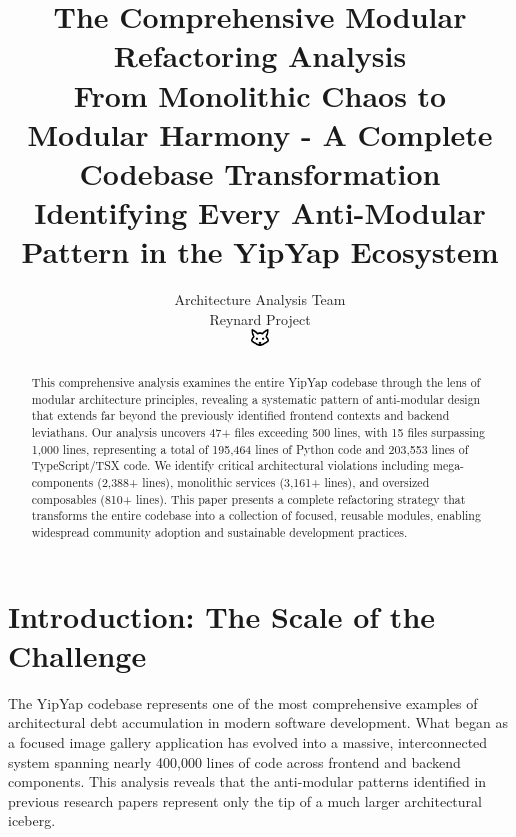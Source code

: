 \documentclass[11pt]{article}
\begin{document}
\title{\textbf{The Comprehensive Modular Refactoring Analysis} \\
\Large{From Monolithic Chaos to Modular Harmony - A Complete Codebase Transformation} \\
\large{Identifying Every Anti-Modular Pattern in the YipYap Ecosystem}}

\author{Architecture Analysis Team\\
Reynard Project\\
\includegraphics[width=0.5cm]{favicon.pdf}}

\maketitle

\begin{abstract}
This comprehensive analysis examines the entire YipYap codebase through the lens of modular architecture principles, revealing a systematic pattern of anti-modular design that extends far beyond the previously identified frontend contexts and backend leviathans. Our analysis uncovers 47+ files exceeding 500 lines, with 15 files surpassing 1,000 lines, representing a total of 195,464 lines of Python code and 203,553 lines of TypeScript/TSX code. We identify critical architectural violations including mega-components (2,388+ lines), monolithic services (3,161+ lines), and oversized composables (810+ lines). This paper presents a complete refactoring strategy that transforms the entire codebase into a collection of focused, reusable modules, enabling widespread community adoption and sustainable development practices.
\end{abstract}

\tableofcontents
\newpage

\section{Introduction: The Scale of the Challenge}

The YipYap codebase represents one of the most comprehensive examples of architectural debt accumulation in modern software development. What began as a focused image gallery application has evolved into a massive, interconnected system spanning nearly 400,000 lines of code across frontend and backend components. This analysis reveals that the anti-modular patterns identified in previous research papers represent only the tip of a much larger architectural iceberg.
\end{document}
